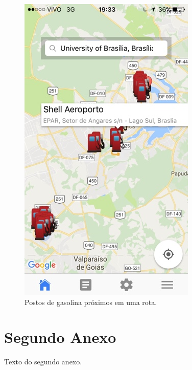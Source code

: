 \begin{anexosenv}
\begin{figure}[H]
    \centering
    \includegraphics[scale=0.5]{figuras/app_5.jpg}
    \caption[Postos de gasolina próximos em uma rota]{Postos de gasolina próximos em uma rota.}
    \label{img:postos_de_gasolina_proximos_em_uma_rota}
\end{figure}

\chapter{Segundo Anexo}

Texto do segundo anexo.

\end{anexosenv}
